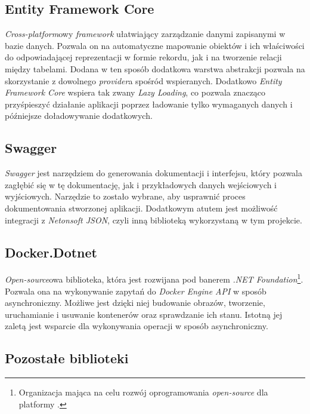 \subsection{Entity Framework Core}

\par \emph{Cross-platform}owy \emph{framework} ułatwiający zarządzanie danymi zapisanymi w bazie danych. Pozwala on na automatyczne mapowanie obiektów i ich właściwości do odpowiadającej reprezentacji w formie rekordu, jak i na tworzenie relacji między tabelami. Dodana w ten sposób dodatkowa warstwa abstrakcji pozwala na skorzystanie z dowolnego \emph{provider}a spośród wspieranych. Dodatkowo \emph{Entity Framework Core} wspiera tak zwany \emph{Lazy Loading}, co pozwala znacząco przyśpieszyć działanie aplikacji poprzez ładowanie tylko wymaganych danych i późniejsze doładowywanie dodatkowych\cite{ENTITY_FRAMEWORK_DOCUMENTATION}.

\subsection{Swagger}
\label{subsec:swagger}

\par \emph{Swagger} jest narzędziem do generowania dokumentacji i interfejsu, który pozwala zagłębić się w tę dokumentację, jak i przykładowych danych wejściowych i wyjściowych. Narzędzie to zostało wybrane, aby usprawnić proces dokumentowania stworzonej aplikacji. Dodatkowym atutem jest możliwość integracji z \emph{Netonsoft JSON}, czyli inną biblioteką wykorzystaną w tym projekcie\cite{SWAGGER_DOCUMENTATION}.

\subsection{Docker.Dotnet}

\par \emph{Open-source}owa biblioteka, która jest rozwijana pod banerem \emph{.NET Foundation}\footnote{Organizacja mająca na celu rozwój oprogramowania \emph{open-source} dla platformy \emph{\dotnet{}}.}. Pozwala ona na wykonywanie zapytań do \emph{Docker Engine API} w sposób asynchroniczny. Możliwe jest dzięki niej budowanie obrazów, tworzenie, uruchamianie i usuwanie kontenerów oraz sprawdzanie ich stanu. Istotną jej zaletą jest wsparcie dla wykonywania operacji w sposób asynchroniczny\cite{DockerDotNet_GitHub}.

\subsection{Pozostałe biblioteki}

